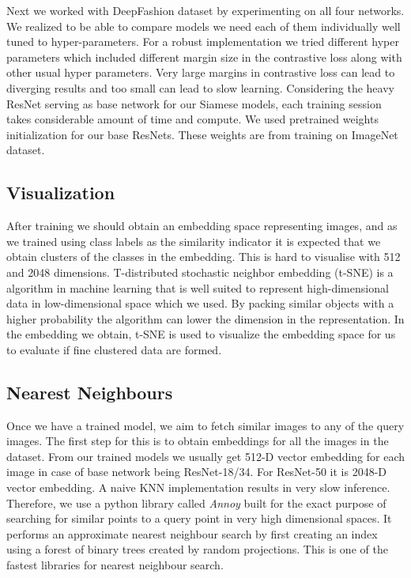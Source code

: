 \documentclass{article}
\begin{document}
Next we worked with DeepFashion dataset by experimenting on all four networks. We realized to be able to compare models we need each of them individually well tuned to hyper-parameters. For a robust implementation we tried different hyper parameters which included different margin size in the contrastive loss along with other usual hyper parameters. Very large margins in contrastive loss can lead to diverging results and too small can lead to slow learning. Considering the heavy ResNet serving as base network for our Siamese models, each training session takes considerable amount of time and compute. We used pretrained weights initialization for our base ResNets. These weights are from training on ImageNet dataset. 

\subsection{Visualization}
After training we should obtain an embedding space representing images, and as we trained using class labels as the similarity indicator it is expected that we obtain clusters of the classes in the embedding. This is hard to visualise with 512 and 2048 dimensions. T-distributed stochastic neighbor embedding (t-SNE) is a algorithm in machine learning that is well suited to represent high-dimensional data in low-dimensional space which we used. By packing similar objects with a higher probability the algorithm can lower the dimension in the representation. In the embedding we obtain, t-SNE is used to visualize the embedding space for us to evaluate if fine clustered data are formed.

\subsection{Nearest Neighbours}
Once we have a trained model, we aim to fetch similar images to any of the query images. The first step for this is to obtain embeddings for all the images in the dataset. From our trained models we usually get 512-D vector embedding for each image in case of base network being ResNet-18/34. For ResNet-50 it is 2048-D vector embedding. A naive KNN implementation results in very slow inference. Therefore, we use a python library called \textit{Annoy} \cite{AnnoyGitHub} built for the exact purpose of searching for similar points to a query point in very high dimensional spaces. It performs an approximate nearest neighbour search by first creating an index using a forest of binary trees created by random projections. This is one of the fastest libraries for nearest neighbour search. 
\end{document}

